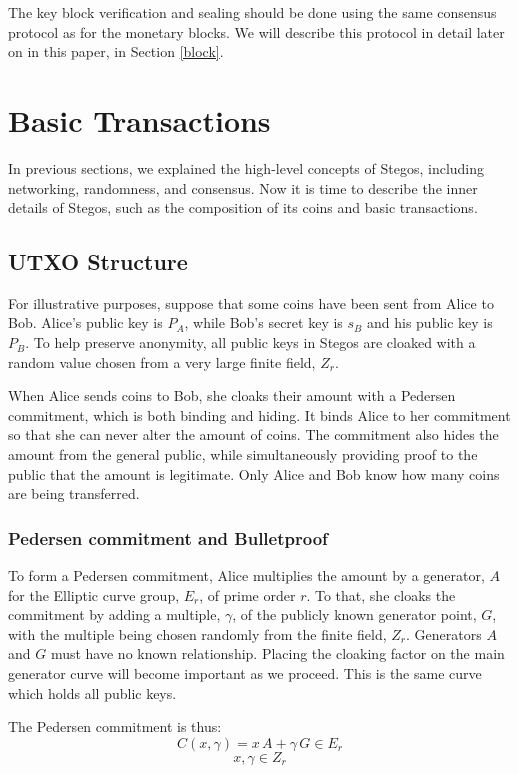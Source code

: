 \documentclass[a4paper, 10pt, conference]{ieeeconf}
\begin{document}
The key block verification and sealing should be done using the same consensus protocol as for the monetary blocks. We will describe this protocol in detail later on in this paper, in Section \ref{block}.

\section{Basic Transactions}\label{transactions}

In previous sections, we explained the high-level concepts of Stegos, including networking, randomness, and consensus. Now it is time to describe the inner details of Stegos, such as the composition of its coins and basic transactions.

\subsection{UTXO Structure}\label{utxo}

For illustrative purposes, suppose that some coins have been sent from Alice to Bob. Alice's public key is $P_A$, while Bob's secret key is $s_B$ and his public key is $P_B$. To help preserve anonymity, all public keys in Stegos are cloaked with a random value chosen from a very large finite field, $Z_r$.

When Alice sends coins to Bob, she cloaks their amount with a Pedersen commitment, which is both binding and hiding. It binds Alice to her commitment so that she can never alter the amount of coins. The commitment also hides the amount from the general public, while simultaneously providing proof to the public that the amount is legitimate. Only Alice and Bob know how many coins are being transferred. 

\subsubsection{Pedersen commitment and Bulletproof} To form a Pedersen commitment, Alice multiplies the amount by a generator, $A$ for the Elliptic curve group, $E_r$, of prime order $r$. To that, she cloaks the commitment by adding a multiple, $\gamma$, of the publicly known generator point, $G$, with the multiple being chosen randomly from the finite field, $Z_r$. Generators $A$ and $G$ must have no known relationship. Placing the cloaking factor on the main generator curve will become important as we proceed. This is the same curve which holds all public keys. 

The Pedersen commitment is thus:
$$ C(x, \gamma) = x \, A + \gamma \, G \in E_r$$
$$x, \gamma \in Z_r$$
\end{document}
